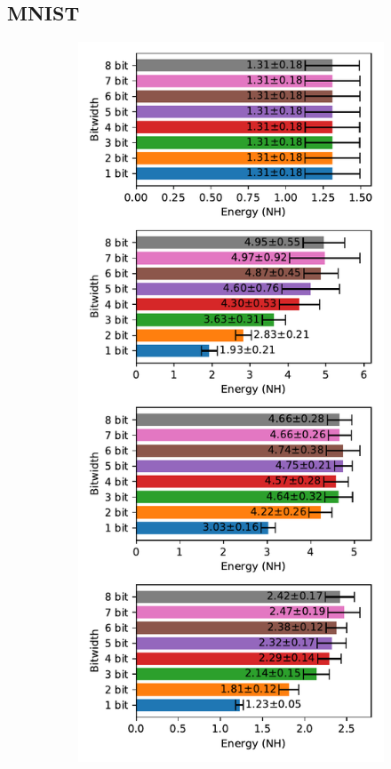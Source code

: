     \subsection{MNIST}
    \label{appendix:energy_neuromorphic_mnist}

        \begin{figure}[H]
            \centering
            \begin{subfigure}[H]{0.495\textwidth}
                \includegraphics[width=\textwidth]{../standard/MNIST/plots/mnist_test_energy_nh.pdf}

\end{subfigure}
\end{figure}
